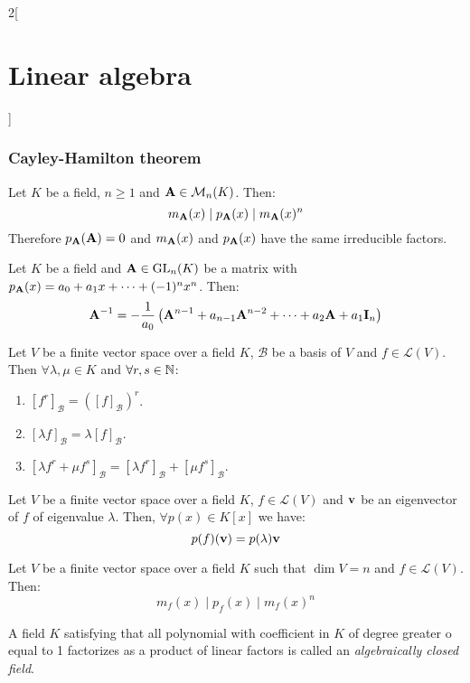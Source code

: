 \documentclass[../../../main.tex]{subfiles}
\begin{document}
\begin{multicols}{2}[\section{Linear algebra}]
  \subsubsection{Cayley-Hamilton theorem}
  \begin{theorem}
    Let $K$ be a field, $n\geq 1$ and $\boldsymbol{\mathrm{A}}\in\mathcal{M}_n(K)$. Then: $$m_{\boldsymbol{\mathrm{A}}}(x)\mid p_{\boldsymbol{\mathrm{A}}}(x)\mid m_{\boldsymbol{\mathrm{A}}}(x)^n$$ Therefore $p_{\boldsymbol{\mathrm{A}}}(\boldsymbol{\mathrm{A}})=0$ and $m_{\boldsymbol{\mathrm{A}}}(x)$ and $p_{\boldsymbol{\mathrm{A}}}(x)$ have the same irreducible factors.
  \end{theorem}
  \begin{corollary}
    Let $K$ be a field and $\boldsymbol{\mathrm{A}}\in\mathrm{GL}_n(K)$ be a matrix with $p_{\boldsymbol{\mathrm{A}}}(x)=a_0+a_1x+\cdots+(-1)^nx^n$. Then: $$\boldsymbol{\mathrm{A}}^{-1}=-\frac{1}{a_0}\left(\boldsymbol{\mathrm{A}}^{n-1}+a_{n-1}\boldsymbol{\mathrm{A}}^{n-2}+\cdots+a_2\boldsymbol{\mathrm{A}}+a_1\boldsymbol{\mathrm{I}}_n\right)$$
  \end{corollary}
  \begin{lemma}
    Let $V$ be a finite vector space over a field $K$, $\mathcal{B}$ be a basis of $V$ and $f\in\mathcal{L}(V)$. Then $\forall\lambda,\mu\in K$ and $\forall r,s\in\mathbb{N}$:
    \begin{enumerate}
      \item $[f^r]_\mathcal{B}={\left([f]_\mathcal{B}\right)}^r$.
      \item $[\lambda f]_\mathcal{B}=\lambda[f]_\mathcal{B}$.
      \item $[\lambda f^r+\mu f^s]_\mathcal{B}=[\lambda f^r]_\mathcal{B}+[\mu f^s]_\mathcal{B}$.
    \end{enumerate}
  \end{lemma}
  \begin{lemma}
    Let $V$ be a finite vector space over a field $K$, $f\in\mathcal{L}(V)$ and $\boldsymbol{\mathrm{v}}$ be an eigenvector of $f$ of eigenvalue $\lambda$. Then, $\forall p(x)\in K[x]$ we have: $$p(f)(\boldsymbol{\mathrm{v}})=p(\lambda)\boldsymbol{\mathrm{v}}$$
  \end{lemma}
  \begin{theorem}
    Let $V$ be a finite vector space over a field $K$ such that $\dim V=n$ and $f\in\mathcal{L}(V)$. Then: $$m_f(x)\mid p_f(x)\mid m_f(x)^n$$
  \end{theorem}
  \begin{definition}
    A field $K$ satisfying that all polynomial with coefficient in $K$ of degree greater o equal to 1 factorizes as a product of linear factors is called an \emph{algebraically closed field}.

\end{definition}
\end{multicols}
\end{document}
